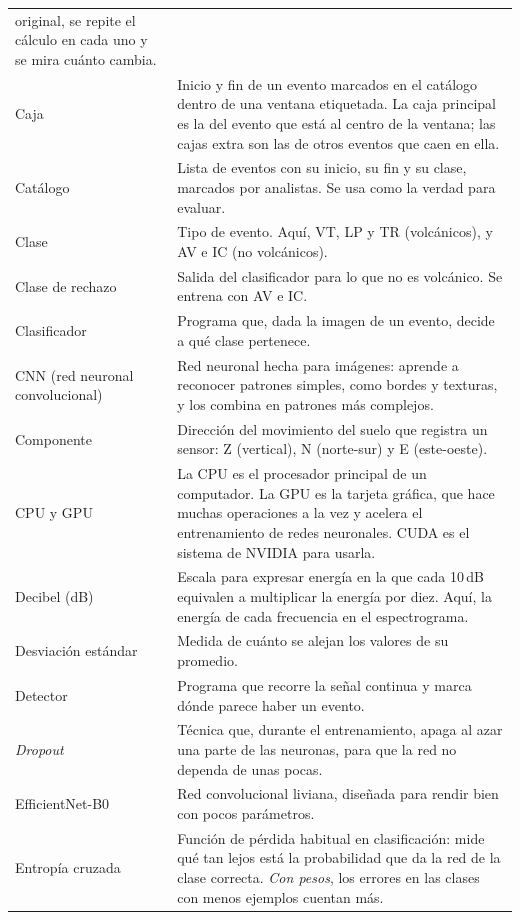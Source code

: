 {\begin{longtable}{>{\raggedright\arraybackslash}p{3.4cm}>{\raggedright\arraybackslash}p{9.4cm}}
original, se repite el cálculo en cada uno y se mira cuánto cambia. \\
Caja & Inicio y fin de un evento marcados en el catálogo dentro de una ventana
etiquetada. La caja principal es la del evento que está al centro de la
ventana; las cajas extra son las de otros eventos que caen en ella. \\
Catálogo & Lista de eventos con su inicio, su fin y su clase, marcados por
analistas. Se usa como la verdad para evaluar. \\
Clase & Tipo de evento. Aquí, VT, LP y TR (volcánicos), y AV e IC (no
volcánicos). \\
Clase de rechazo & Salida del clasificador para lo que no es volcánico. Se
entrena con AV e IC. \\
Clasificador & Programa que, dada la imagen de un evento, decide a qué clase
pertenece. \\
CNN (red neuronal convolucional) & Red neuronal hecha para imágenes: aprende a
reconocer patrones simples, como bordes y texturas, y los combina en patrones
más complejos. \\
Componente & Dirección del movimiento del suelo que registra un sensor: Z
(vertical), N (norte-sur) y E (este-oeste). \\
CPU y GPU & La CPU es el procesador principal de un computador. La GPU es la
tarjeta gráfica, que hace muchas operaciones a la vez y acelera el
entrenamiento de redes neuronales. CUDA es el sistema de NVIDIA para usarla. \\
Decibel (dB) & Escala para expresar energía en la que cada 10\,dB equivalen a
multiplicar la energía por diez. Aquí, la energía de cada frecuencia en el
espectrograma. \\
Desviación estándar & Medida de cuánto se alejan los valores de su promedio. \\
Detector & Programa que recorre la señal continua y marca dónde parece haber
un evento. \\
\emph{Dropout} & Técnica que, durante el entrenamiento, apaga al azar una parte
de las neuronas, para que la red no dependa de unas pocas. \\
EfficientNet-B0 & Red convolucional liviana, diseñada para rendir bien con
pocos parámetros. \\
Entropía cruzada & Función de pérdida habitual en clasificación: mide qué tan
lejos está la probabilidad que da la red de la clase correcta. \emph{Con
pesos}, los errores en las clases con menos ejemplos cuentan más. \\

\end{longtable}}
